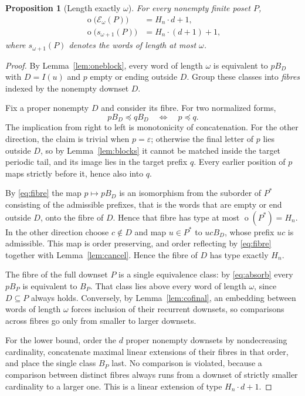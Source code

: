\documentclass[11pt,a4paper]{article}
\numberwithin{equation}{section}
\newtheorem{proposition}[theorem]{Proposition}
\theoremstyle{definition}
\theoremstyle{remark}
\newcommand{\mot}{\mathop{o}}
\newcommand{\eps}{\varepsilon}
\newcommand{\emb}{\preccurlyeq}
\newcommand{\Hn}[1]{H_{#1}}
\newcommand{\E}{\mathcal E}
\begin{document}
\begin{proposition}[Length exactly $\omega$]\label{prop:exactomega}
For every nonempty finite poset $P$,
\begin{align}
 \mot\bigl(\E_\omega(P)\bigr)&=\Hn n\cdot d+1,\label{eq:exactomega}\\
 \mot\bigl(s_{\omega+1}(P)\bigr)&=\Hn n\cdot(d+1)+1,\label{eq:atmostomega}
\end{align}
where $s_{\omega+1}(P)$ denotes the words of length at most $\omega$.
\end{proposition}
\begin{proof}
By Lemma~\ref{lem:oneblock}, every word of length $\omega$ is equivalent to
$pB_D$ with $D=I(u)$ and $p$ empty or ending outside $D$. Group these classes
into \emph{fibres} indexed by the nonempty downset $D$.

Fix a proper nonempty $D$ and consider its fibre. For two normalized forms,
\begin{equation}\label{eq:fibre}
 pB_D\emb qB_D\quad\Longleftrightarrow\quad p\emb q.
\end{equation}
The implication from right to left is monotonicity of concatenation. For the
other direction, the claim is trivial when $p=\eps$; otherwise the final
letter of $p$ lies outside $D$, so by Lemma~\ref{lem:blocks} it cannot be
matched inside the target periodic tail, and its image lies in the target
prefix $q$. Every earlier position of $p$ maps strictly before it, hence also
into $q$.

By \eqref{eq:fibre} the map $p\mapsto pB_D$ is an isomorphism from the
suborder of $P^*$ consisting of the admissible prefixes, that is the words
that are empty or end outside $D$, onto the fibre of $D$. Hence that fibre has
type at most $\mot(P^*)=\Hn n$. In the other direction choose $c\notin D$ and
map $u\in P^*$ to $ucB_D$, whose prefix $uc$ is admissible. This map is order
preserving, and order reflecting by \eqref{eq:fibre} together with
Lemma~\ref{lem:cancel}. Hence the fibre of $D$ has type exactly $\Hn n$.

The fibre of the full downset $P$ is a single equivalence class: by
\eqref{eq:absorb} every $pB_P$ is equivalent to $B_P$. That class lies above
every word of length $\omega$, since $D\subseteq P$ always holds.
Conversely, by Lemma~\ref{lem:cofinal}, an embedding between words of length
$\omega$ forces inclusion of their recurrent downsets, so comparisons across
fibres go only from smaller to larger downsets.

For the lower bound, order the $d$ proper nonempty downsets by nondecreasing
cardinality, concatenate maximal linear extensions of their fibres in that
order, and place the single class $B_P$ last. No comparison is violated,
because a comparison between distinct fibres always runs from a downset of
strictly smaller cardinality to a larger one. This is a linear extension of
type $\Hn n\cdot d+1$.


\end{proof}
\end{document}
